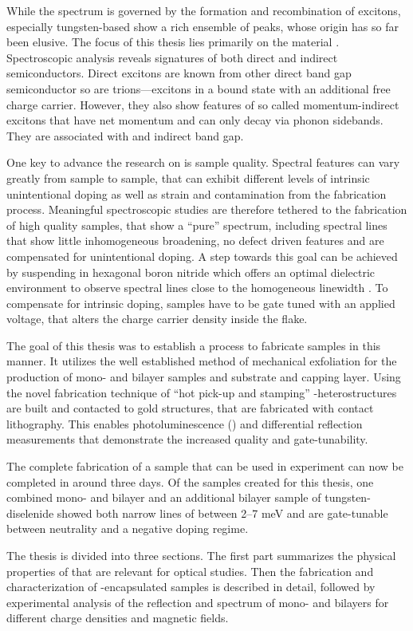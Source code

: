 While the spectrum is governed by the formation and recombination of excitons, especially tungsten-based \tmds show a rich ensemble of peaks, whose origin has so far been elusive. The focus of this thesis lies primarily on the material \wse\!. Spectroscopic analysis reveals signatures of both direct and indirect semiconductors. Direct excitons are known from other direct band gap semiconductor so are trions---excitons in a bound state with an additional free charge carrier. However, they also show features of so called momentum-indirect excitons that have net momentum and can only decay via phonon sidebands. They are associated with and indirect band gap.

One key to advance the research on \tmds is sample quality. Spectral features can vary greatly from sample to sample, that can exhibit different levels of intrinsic unintentional doping as well as strain and contamination from the fabrication process. Meaningful spectroscopic studies are therefore tethered to the fabrication of high quality samples, that show a ``pure'' spectrum, including spectral lines that show little inhomogeneous broadening, no defect driven features and are compensated for unintentional doping. A step towards this goal can be achieved by suspending \tmds in hexagonal boron nitride which offers an optimal dielectric environment to observe spectral lines close to the homogeneous linewidth \cite{dean_boron_2010,cadiz_excitonic_2017}. To compensate for intrinsic doping, samples have to be gate tuned with an applied voltage, that alters the charge carrier density inside the flake.

The goal of this thesis was to establish a process to fabricate samples in this manner. It utilizes the well established method of mechanical exfoliation for the production of \tmdg mono- and bilayer samples and \hbng substrate and capping layer. Using the novel fabrication technique of ``hot pick-up and stamping'' \hbn-\tmdg heterostructures are built and contacted to gold structures, that are fabricated with contact lithography. This enables photoluminescence (\pl) and differential reflection measurements that demonstrate the increased quality and gate-tunability.

The complete fabrication of a sample that can be used in experiment can now be completed in around three days. Of the samples created for this thesis, one combined mono- and bilayer and an additional bilayer sample of tungsten-diselenide showed both narrow lines of between 2--7 meV and are gate-tunable between neutrality and a negative doping regime. 

The thesis is divided into three sections. The first part summarizes the physical properties of \tmds that are relevant for optical studies. Then the fabrication and characterization of \hbn-encapsulated samples is described in detail, followed by experimental analysis of the reflection and \pl spectrum of \wse mono- and bilayers for different charge densities and magnetic fields.




